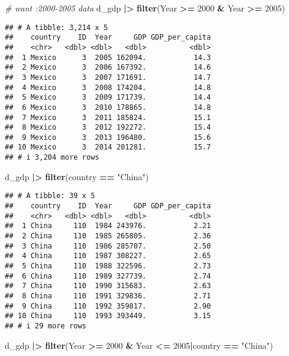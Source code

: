\documentclass[
]{article}
\newenvironment{Shaded}{\begin{snugshade}}{\end{snugshade}}
\newcommand{\CommentTok}[1]{\textcolor[rgb]{0.56,0.35,0.01}{\textit{#1}}}
\newcommand{\DecValTok}[1]{\textcolor[rgb]{0.00,0.00,0.81}{#1}}
\newcommand{\FunctionTok}[1]{\textcolor[rgb]{0.13,0.29,0.53}{\textbf{#1}}}
\newcommand{\NormalTok}[1]{#1}
\newcommand{\SpecialCharTok}[1]{\textcolor[rgb]{0.81,0.36,0.00}{\textbf{#1}}}
\newcommand{\StringTok}[1]{\textcolor[rgb]{0.31,0.60,0.02}{#1}}
\begin{document}
\begin{Shaded}
\begin{Highlighting}[]
\CommentTok{\# want :2000{-}2005 data }
\NormalTok{d\_gdp }\SpecialCharTok{|\textgreater{}}
   \FunctionTok{filter}\NormalTok{(Year }\SpecialCharTok{\textgreater{}=} \DecValTok{2000} \SpecialCharTok{\&}\NormalTok{ Year }\SpecialCharTok{\textgreater{}=} \DecValTok{2005}\NormalTok{)}
\end{Highlighting}
\end{Shaded}

\begin{verbatim}
## # A tibble: 3,214 x 5
##    country    ID  Year     GDP GDP_per_capita
##    <chr>   <dbl> <dbl>   <dbl>          <dbl>
##  1 Mexico      3  2005 162094.           14.3
##  2 Mexico      3  2006 167392.           14.6
##  3 Mexico      3  2007 171691.           14.7
##  4 Mexico      3  2008 174204.           14.8
##  5 Mexico      3  2009 171739.           14.4
##  6 Mexico      3  2010 178865.           14.8
##  7 Mexico      3  2011 185824.           15.1
##  8 Mexico      3  2012 192272.           15.4
##  9 Mexico      3  2013 196480.           15.6
## 10 Mexico      3  2014 201281.           15.7
## # i 3,204 more rows
\end{verbatim}

\begin{Shaded}
\begin{Highlighting}[]
\NormalTok{d\_gdp }\SpecialCharTok{|\textgreater{}} 
  \FunctionTok{filter}\NormalTok{(country }\SpecialCharTok{==} \StringTok{"China"}\NormalTok{)}
\end{Highlighting}
\end{Shaded}

\begin{verbatim}
## # A tibble: 39 x 5
##    country    ID  Year     GDP GDP_per_capita
##    <chr>   <dbl> <dbl>   <dbl>          <dbl>
##  1 China     110  1984 243976.           2.21
##  2 China     110  1985 265805.           2.36
##  3 China     110  1986 285707.           2.50
##  4 China     110  1987 308227.           2.65
##  5 China     110  1988 322596.           2.73
##  6 China     110  1989 327739.           2.74
##  7 China     110  1990 315683.           2.63
##  8 China     110  1991 329836.           2.71
##  9 China     110  1992 359817.           2.90
## 10 China     110  1993 393449.           3.15
## # i 29 more rows
\end{verbatim}

\begin{Shaded}
\begin{Highlighting}[]
\NormalTok{d\_gdp }\SpecialCharTok{|\textgreater{}} \FunctionTok{filter}\NormalTok{(Year }\SpecialCharTok{\textgreater{}=} \DecValTok{2000} \SpecialCharTok{\&}\NormalTok{ Year }\SpecialCharTok{\textless{}=} \DecValTok{2005}\SpecialCharTok{|}\NormalTok{country }\SpecialCharTok{==} \StringTok{"China"}\NormalTok{)}
\end{Highlighting}
\end{Shaded}
\end{document}
